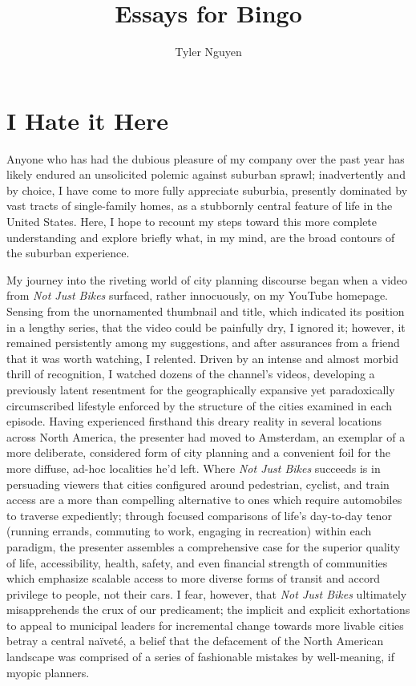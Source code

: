 \documentclass[oneside, a5paper]{book}
\begin{document}
\title{Essays for Bingo}
\author{Tyler Nguyen}
\maketitle
\chapter{I Hate it Here}
Anyone who has had the dubious pleasure of my company over the past year has likely endured an unsolicited polemic against suburban sprawl; inadvertently and by choice, I have come to more fully appreciate suburbia, presently dominated by vast tracts of single-family homes, as a stubbornly central feature of life in the United States. Here, I hope to recount my steps toward this more complete understanding and explore briefly what, in my mind, are the broad contours of the suburban experience.

My journey into the riveting world of city planning discourse began when a video from \textit{Not Just Bikes} surfaced, rather innocuously, on my YouTube homepage. Sensing from the unornamented thumbnail and title, which indicated its position in a lengthy series, that the video could be painfully dry, I ignored it; however, it remained persistently among my suggestions, and after assurances from a friend that it was worth watching, I relented. Driven by an intense and almost morbid thrill of recognition, I watched dozens of the channel's videos, developing a previously latent resentment for the geographically expansive yet paradoxically circumscribed lifestyle enforced by the structure of the cities examined in each episode. Having experienced firsthand this dreary reality in several locations across North America, the presenter had moved to Amsterdam, an exemplar of a more deliberate, considered form of city planning and a convenient foil for the more diffuse, ad-hoc localities he'd left. Where \textit{Not Just Bikes} succeeds is in persuading viewers that cities configured around pedestrian, cyclist, and train access are a more than compelling alternative to ones which require automobiles to traverse expediently; through focused comparisons of life's day-to-day tenor (running errands, commuting to work, engaging in recreation) within each paradigm, the presenter assembles a comprehensive case for the superior quality of life, accessibility, health, safety, and even financial strength of communities which emphasize scalable access to more diverse forms of transit and accord privilege to people, not their cars. I fear, however, that \textit{Not Just Bikes} ultimately misapprehends the crux of our predicament; the implicit and explicit exhortations to appeal to municipal leaders for incremental change towards more livable cities betray a central na\"ivet\'e, a belief that the defacement of the North American landscape was comprised of a series of fashionable mistakes by well-meaning, if myopic planners.
\end{document}
